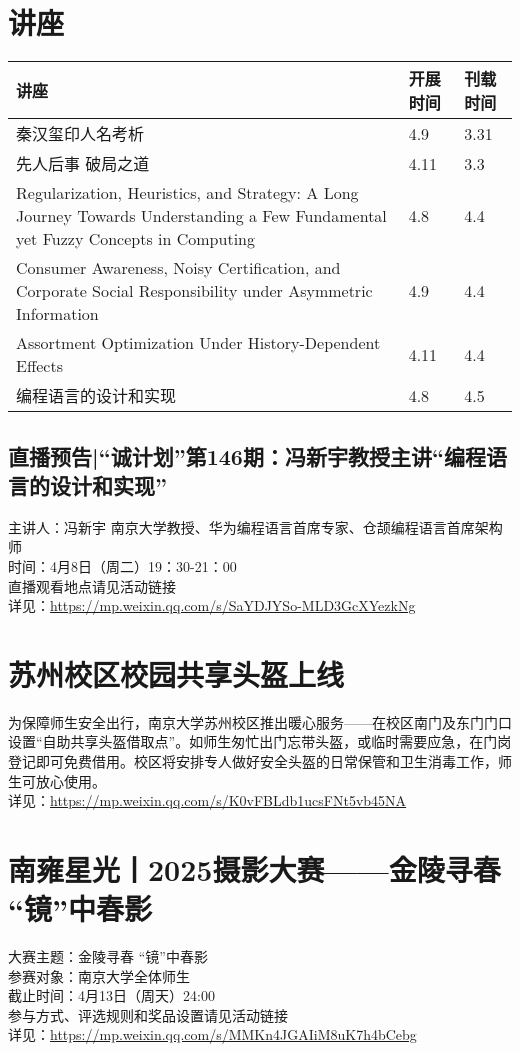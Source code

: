 \documentclass[letterpaper, 12pt]{article}
\begin{document}
\begin{multicols}{2}
\pagebreak

\section{讲座}
\begin{tabular}{|>{\centering\arraybackslash}m{}|m{}|m{}|}
    \hline
    讲座 & 开展时间 & 刊载时间\\
    \hline\hline
    秦汉玺印人名考析 & 4.9 & 3.31\\\hline
    先人后事 破局之道 & 4.11 & 3.3\\\hline
    Regularization, Heuristics, and Strategy: A Long Journey Towards Understanding a Few Fundamental yet Fuzzy Concepts in Computing & 4.8 & 4.4\\\hline
    Consumer Awareness, Noisy Certification, and Corporate Social Responsibility under Asymmetric Information & 4.9 & 4.4\\\hline
    Assortment Optimization Under History-Dependent Effects & 4.11 & 4.4\\\hline
    编程语言的设计和实现 & 4.8 & 4.5\\\hline
\end{tabular}
\subsection{直播预告|“诚计划”第146期：冯新宇教授主讲“编程语言的设计和实现”}
主讲人：冯新宇 南京大学教授、华为编程语言首席专家、仓颉编程语言首席架构师
\\时间：4月8日（周二）19：30-21：00
\\直播观看地点请见活动链接
\\详见：\url{https://mp.weixin.qq.com/s/SaYDJYSo-MLD3GcXYezkNg}
\section{苏州校区校园共享头盔上线}
为保障师生安全出行，南京大学苏州校区推出暖心服务——在校区南门及东门门口设置“自助共享头盔借取点”。如师生匆忙出门忘带头盔，或临时需要应急，在门岗登记即可免费借用。校区将安排专人做好安全头盔的日常保管和卫生消毒工作，师生可放心使用。
\\详见：\url{https://mp.weixin.qq.com/s/K0vFBLdb1ucsFNt5vb45NA}

\section{南雍星光丨2025摄影大赛——金陵寻春 “镜”中春影}
大赛主题：金陵寻春 “镜”中春影
\\参赛对象：南京大学全体师生
\\截止时间：4月13日（周天）24:00
\\参与方式、评选规则和奖品设置请见活动链接
\\详见：\url{https://mp.weixin.qq.com/s/MMKn4JGAIiM8uK7h4bCebg}

\end{multicols}
\end{document}

